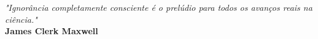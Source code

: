 \begin{epigrafe}
  \vspace*{\fill}
  \hspace*{\fill}\parbox[b]{.5\textwidth}{%
    \linespread{1}\selectfont
    \begin{flushright}
      \textit{"Ignorância completamente consciente é o prelúdio para todos os avanços reais na ciência."}\\
      \vspace{\onelineskip}
      {\bfseries James Clerk Maxwell}
    \end{flushright}
  }
\end{epigrafe}
